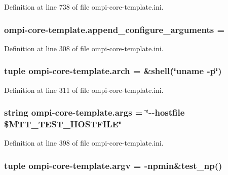 Definition at line 738 of file ompi-\/core-\/template.\-ini.

\hypertarget{namespaceompi-core-template_ad3863a095d671688912d3297baf0f161}{
\subsubsection[{append\-\_\-configure\-\_\-arguments}]{\setlength{\rightskip}{0pt plus 5cm}ompi-\/core-\/template.\-append\-\_\-configure\-\_\-arguments =}}\label{namespaceompi-core-template_ad3863a095d671688912d3297baf0f161}


Definition at line 308 of file ompi-\/core-\/template.\-ini.

\hypertarget{namespaceompi-core-template_a710dd59a52ca88aad0a440a9d78a386c}{
\subsubsection[{arch}]{\setlength{\rightskip}{0pt plus 5cm}tuple ompi-\/core-\/template.\-arch = \&shell(\char`\"{}uname -\/p\char`\"{})}}\label{namespaceompi-core-template_a710dd59a52ca88aad0a440a9d78a386c}


Definition at line 311 of file ompi-\/core-\/template.\-ini.

\hypertarget{namespaceompi-core-template_ae07cf7e00726c06dc500a54b713819c8}{
\subsubsection[{args}]{\setlength{\rightskip}{0pt plus 5cm}string ompi-\/core-\/template.\-args = \char`\"{}-\/-\/hostfile \$M\-T\-T\-\_\-\-T\-E\-S\-T\-\_\-\-H\-O\-S\-T\-F\-I\-L\-E\char`\"{}}}\label{namespaceompi-core-template_ae07cf7e00726c06dc500a54b713819c8}


Definition at line 398 of file ompi-\/core-\/template.\-ini.

\hypertarget{namespaceompi-core-template_a1a108c65ace2fa4cbdad43345d2139c8}{
\subsubsection[{argv}]{\setlength{\rightskip}{0pt plus 5cm}tuple ompi-\/core-\/template.\-argv = -\/npmin\&test\-\_\-np()}}\label{namespaceompi-core-template_a1a108c65ace2fa4cbdad43345d2139c8}


